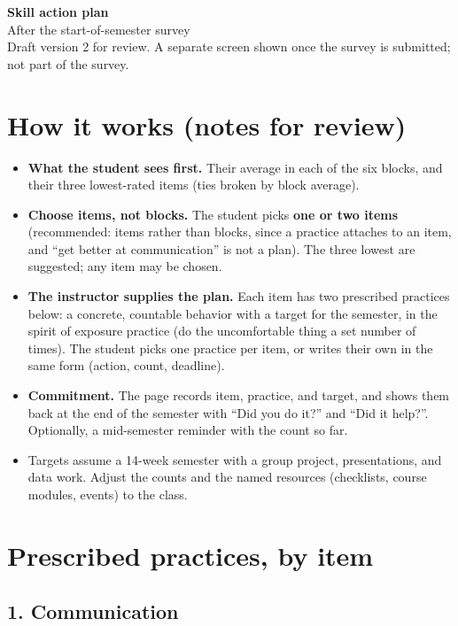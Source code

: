 \documentclass[11pt,letterpaper]{article}
\begin{document}
\begin{center}
{\LARGE\bfseries Skill action plan}\\[4pt]
{\large After the start-of-semester survey}\\[2pt]
{\small\color{gray} Draft version 2 for review. A separate screen shown once the survey is submitted; not part of the survey.}
\end{center}

\section*{How it works (notes for review)}

\begin{itemize}[leftmargin=1.5em]
\item \textbf{What the student sees first.} Their average in each of the six blocks, and their three lowest-rated items (ties broken by block average).
\item \textbf{Choose items, not blocks.} The student picks \textbf{one or two items} (recommended: items rather than blocks, since a practice attaches to an item, and ``get better at communication'' is not a plan). The three lowest are suggested; any item may be chosen.
\item \textbf{The instructor supplies the plan.} Each item has two prescribed practices below: a concrete, countable behavior with a target for the semester, in the spirit of exposure practice (do the uncomfortable thing a set number of times). The student picks one practice per item, or writes their own in the same form (action, count, deadline).
\item \textbf{Commitment.} The page records item, practice, and target, and shows them back at the end of the semester with ``Did you do it?'' and ``Did it help?''. Optionally, a mid-semester reminder with the count so far.
\item Targets assume a 14-week semester with a group project, presentations, and data work. Adjust the counts and the named resources (checklists, course modules, events) to the class.
\end{itemize}

\section*{Prescribed practices, by item}

\subsection*{1. Communication}
\end{document}
